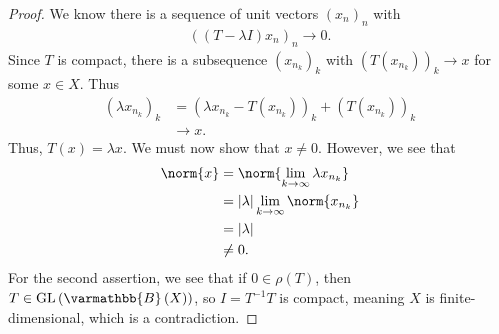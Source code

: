 \documentclass[10pt]{mypackage}
\renewcommand*{\mathbb}[1]{\varmathbb{#1}}
\newcommand{\B}{\mathbb{B}}
\begin{document}
\begin{proof}
  We know there is a sequence of unit vectors $\left(x_n\right)_n$ with
  \begin{align*}
    \left(\left(T - \lambda I\right)x_n\right)_n \rightarrow 0.
  \end{align*}
  Since $T$ is compact, there is a subsequence $\left(x_{n_k}\right)_k$ with $\left(T\left(x_{n_k}\right)\right)_k\rightarrow x$ for some $x\in X$. Thus
  \begin{align*}
    \left(\lambda x_{n_k}\right)_k &= \left(\lambda x_{n_k} - T\left(x_{n_k}\right)\right)_k + \left(T\left(x_{n_k}\right)\right)_k\\
                                   &\rightarrow x.
  \end{align*}
  Thus, $T\left(x\right) = \lambda x$. We must now show that $x\neq 0$. However, we see that
  \begin{align*}
    \norm{x} &= \norm{\lim_{k\rightarrow\infty}\lambda x_{n_k}}\\
             &= \left\vert \lambda \right\vert \lim_{k\rightarrow\infty}\norm{x_{n_k}}\\
             &= \left\vert \lambda \right\vert\\
             &\neq 0.
  \end{align*}
  For the second assertion, we see that if $0\in \rho\left(T\right)$, then $T\in \text{GL}\left(\B\left(X\right)\right)$, so $I = T^{-1}T$ is compact, meaning $X$ is finite-dimensional, which is a contradiction.
\end{proof}
\end{document}
